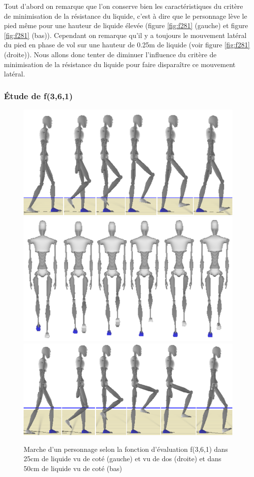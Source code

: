 \documentclass[runningheads,a4paper]{llncs}
\begin{document}
Tout d'abord on remarque que l'on conserve bien les caractéristiques du critère de minimisation de la résistance du liquide, c'est à dire que le personnage lève le pied même pour une hauteur de liquide élevée (figure \ref{fig:f281} (gauche) et figure \ref{fig:f281} (bas)). Cependant on remarque qu'il y a toujours le mouvement latéral du pied en phase de vol sur une hauteur de 0.25m de liquide (voir figure \ref{fig:f281} (droite)). Nous allons donc tenter de diminuer l'influence du critère de minimisation de la résistance du liquide pour faire disparaître ce mouvement latéral.

\subsubsection{Étude de f(3,6,1)}
\begin{figure}[h]
\centering
\includegraphics[scale=0.35]{strips/3_6_1_25cm.png}
\includegraphics[scale=0.35]{strips/3_6_1_25cm_from_back.png}
\includegraphics[scale=0.35]{strips/3_6_1_50cm.png}
\caption{Marche d'un personnage selon la fonction d'évaluation f(3,6,1) dans 25cm de liquide vu de coté (gauche) et vu de dos (droite) et dans 50cm de liquide vu de coté (bas)}
\label{fig:f361}
\end{figure}
\end{document}
